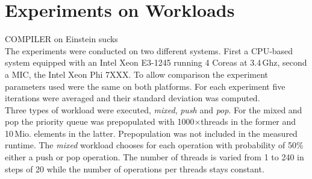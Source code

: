 \section{Experiments on Workloads}
COMPILER on Einstein sucks\\
The experiments were conducted on two different systems. First a CPU-based system equipped with an Intel Xeon E3-1245 running 4 Coreas at 3.4\,Ghz, second a MIC, the Intel Xeon Phi 7XXX. To allow comparison the experiment parameters used were the same on both platforms. For each experiment five iterations were averaged and their standard deviation was computed.\\
Three types of workload were executed, \textit{mixed}, \textit{push} and \textit{pop}. For the mixed and pop the priority queue was prepopulated with 1000$\times$threads in the former and 10\,Mio. elements in the latter. Prepopulation was not included in the measured runtime. The \textit{mixed} workload chooses for each operation with probability of 50\% either a push or pop operation. The number of threads is varied from 1 to 240 in steps of 20 while the number of operations per threads stays constant.


